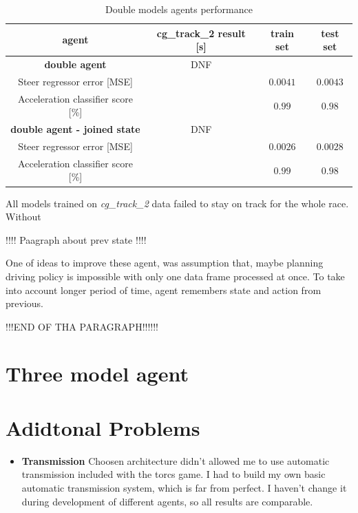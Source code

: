 \documentclass[declaration,shortabstract,english,inz]{iithesis}
\begin{document}
\begin{table}[h]
    \centering
    \begin{tabular}{ |c|c|c|c|}
          \hline
          agent & cg\_track\_2 result [s] & train set & test set \\
          \hline
          \textbf{double agent} & DNF &   &  \\
          \hline
          Steer regressor error [MSE]&   & $0.0041$ & $0.0043$\\
          \hline
          Acceleration classifier score [\%]&  & $0.99$ & $0.98$ \\
          \hline
          \textbf{double agent - joined state} & DNF &   &  \\
          \hline
          Steer regressor error [MSE]&   & $0.0026$ & $0.0028$\\
          \hline
          Acceleration classifier score [\%]&  & $0.99$ & $0.98$ \\
          \hline
          
        \end{tabular}
        \caption{Double models agents performance}
        \label{tab:double_models_results}

\end{table}


All models trained on \textit{cg\_track\_2} data failed to stay on track for the whole race. Without


!!!! Paagraph about prev state !!!!

One of ideas to improve these agent, was assumption that, maybe planning driving policy is impossible with only one data frame processed at once. To take into account longer period of time, agent remembers state and action from previous.

!!!END OF THA PARAGRAPH!!!!!! 

\chapter{Three model agent}





\chapter{Adidtonal Problems}

\begin{itemize}
    \item \textbf{Transmission} Choosen architecture didn't allowed me to use automatic transmission included with the torcs game. I had to build my own basic automatic transmission system, which is far from perfect. I haven't change it during development of different agents, so all results are comparable. 
\end{itemize}
\end{document}
